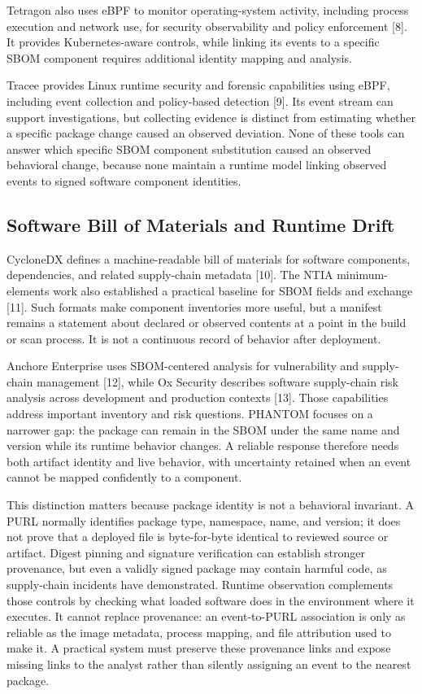 \documentclass[conference]{IEEEtran}
\begin{document}
Tetragon also uses eBPF to monitor operating-system activity, including process execution and network use, for security observability and policy enforcement [8]. It provides Kubernetes-aware controls, while linking its events to a specific SBOM component requires additional identity mapping and analysis.

Tracee provides Linux runtime security and forensic capabilities using eBPF, including event collection and policy-based detection [9]. Its event stream can support investigations, but collecting evidence is distinct from estimating whether a specific package change caused an observed deviation. None of these tools can answer which specific SBOM component substitution caused an observed behavioral change, because none maintain a runtime model linking observed events to signed software component identities.

\subsection{Software Bill of Materials and Runtime Drift}
CycloneDX defines a machine-readable bill of materials for software components, dependencies, and related supply-chain metadata [10]. The NTIA minimum-elements work also established a practical baseline for SBOM fields and exchange [11]. Such formats make component inventories more useful, but a manifest remains a statement about declared or observed contents at a point in the build or scan process. It is not a continuous record of behavior after deployment.

Anchore Enterprise uses SBOM-centered analysis for vulnerability and supply-chain management [12], while Ox Security describes software supply-chain risk analysis across development and production contexts [13]. Those capabilities address important inventory and risk questions. PHANTOM focuses on a narrower gap: the package can remain in the SBOM under the same name and version while its runtime behavior changes. A reliable response therefore needs both artifact identity and live behavior, with uncertainty retained when an event cannot be mapped confidently to a component.

This distinction matters because package identity is not a behavioral invariant. A PURL normally identifies package type, namespace, name, and version; it does not prove that a deployed file is byte-for-byte identical to reviewed source or artifact. Digest pinning and signature verification can establish stronger provenance, but even a validly signed package may contain harmful code, as supply-chain incidents have demonstrated. Runtime observation complements those controls by checking what loaded software does in the environment where it executes. It cannot replace provenance: an event-to-PURL association is only as reliable as the image metadata, process mapping, and file attribution used to make it. A practical system must preserve these provenance links and expose missing links to the analyst rather than silently assigning an event to the nearest package.
\end{document}
